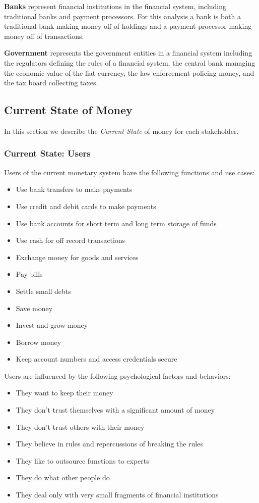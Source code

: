 \documentclass[a4paper,12pt]{article} %
\begin{document}
{\textbf{Banks} represent financial institutions in the financial system, including traditional banks and payment processors. For this analysis a bank is both a traditional bank making money off of holdings and a payment processor making money off of transactions.

\textbf{Government} represents the government entities in a financial system including the regulators defining the rules of a financial system, the central bank managing the economic value of the fiat currency, the law enforcement policing money, and the tax board collecting taxes.

\subsection{Current State of Money} \label{ssec:4.3}

In this section we describe the \textit{Current State} of money for each stakeholder.

\subsubsection{Current State: Users} \label{sssec:4.3:users}

Users of the current monetary system have the following functions and use cases:

\begin{itemize}
	\item Use bank transfers to make payments
	\item Use credit and debit cards to make payments
	\item Use bank accounts for short term and long term storage of funds
	\item Use cash for off record transactions
	\item Exchange money for goods and services
	\item Pay bills
	\item Settle small debts
	\item Save money
	\item Invest and grow money
	\item Borrow money
	\item Keep account numbers and access credentials secure
\end{itemize}

Users are influenced by the following psychological factors and behaviors:

\begin{itemize}
	\item They want to keep their money
	\item They don't trust themselves with a significant amount of money
	\item They don't trust others with their money
	\item They believe in rules and repercussions of breaking the rules
	\item They like to outsource functions to experts
	\item They do what other people do
	\item They deal only with very small fragments of financial institutions
\end{itemize}

}
\end{document}
